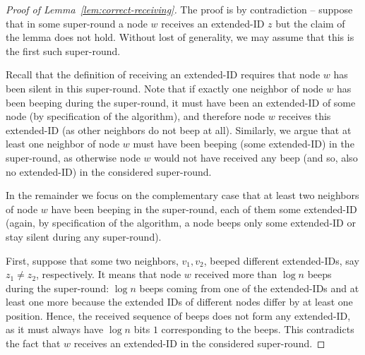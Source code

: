 \begin{proof}[Proof of Lemma~\ref{lem:correct-receiving}]
The proof is by contradiction -- suppose that in some super-round a node $w$ 
receives an extended-ID $z$ but the claim of the lemma does not hold. 
Without lost of generality, we may assume that this is the first such super-round.

Recall that the definition of receiving an extended-ID requires that node $w$ has been silent in this super-round. Note that if exactly one neighbor of node $w$ has been beeping during the super-round, it must have been an extended-ID of some node (by specification of the algorithm), and therefore node $w$ receives this extended-ID (as other neighbors do not beep at all).
Similarly, we argue that at least one neighbor of node $w$ must have been beeping (some extended-ID) in the super-round, as otherwise node $w$ would not have received any beep (and so, also no extended-ID) in the considered super-round.

In the remainder we focus on the complementary case that at least two neighbors of node $w$ have been beeping in the super-round, each of them some extended-ID (again, by specification of the algorithm, a node beeps only some extended-ID or stay silent during any super-round).

First, suppose that some two neighbors, $v_1,v_2$, beeped different extended-IDs, say $z_1\ne z_2$, respectively.
It means that node $w$ received more than $\log n$ beeps during the super-round: $\log n$ beeps coming from one of the extended-IDs and at least one more because the extended IDs of different nodes differ by at least one position. Hence, the received sequence of beeps does not form any extended-ID, as it must always have $\log n$ bits $1$ corresponding to the beeps. This contradicts the fact that $w$ receives an extended-ID in the considered super-round.


\end{proof}
